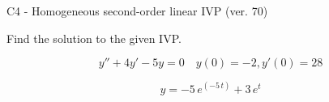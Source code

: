\begin{exercise}
  \begin{exerciseTitle}C4 - Homogeneous second-order linear IVP (ver. 70)\end{exerciseTitle}
  \begin{exerciseStatement}
    
Find the solution to the given IVP.

    
\[y''+4y'-5y = 0 \hspace{1em} y(0) = -2 , y'(0) = 28\]

  \end{exerciseStatement}
  \begin{exerciseAnswer}
    
\[y= -5 \, e^{\left(-5 \, t\right)} + 3 \, e^{t}\]

  \end{exerciseAnswer}
\end{exercise}